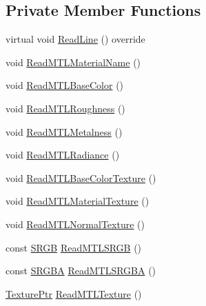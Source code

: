\subsection*{Private Member Functions}
\begin{DoxyCompactItemize}
\item 
virtual void \mbox{\hyperlink{classmage_1_1rendering_1_1loader_1_1_m_t_l_reader_a1a05fa5122b1db5fd095a778fc37d230}{Read\+Line}} () override
\item 
void \mbox{\hyperlink{classmage_1_1rendering_1_1loader_1_1_m_t_l_reader_ab123422945f5937ffe484c1076a6858b}{Read\+M\+T\+L\+Material\+Name}} ()
\item 
void \mbox{\hyperlink{classmage_1_1rendering_1_1loader_1_1_m_t_l_reader_ae228231b40bc5b8a6fdff3a9a5698530}{Read\+M\+T\+L\+Base\+Color}} ()
\item 
void \mbox{\hyperlink{classmage_1_1rendering_1_1loader_1_1_m_t_l_reader_a01438c92852592fd719a85d146e38b65}{Read\+M\+T\+L\+Roughness}} ()
\item 
void \mbox{\hyperlink{classmage_1_1rendering_1_1loader_1_1_m_t_l_reader_a14aa8cd5655730234c460c6060552f68}{Read\+M\+T\+L\+Metalness}} ()
\item 
void \mbox{\hyperlink{classmage_1_1rendering_1_1loader_1_1_m_t_l_reader_acfafc2485c4b84ef84360e35ac8247eb}{Read\+M\+T\+L\+Radiance}} ()
\item 
void \mbox{\hyperlink{classmage_1_1rendering_1_1loader_1_1_m_t_l_reader_a67198ee5158ee7d77e907f6538030aee}{Read\+M\+T\+L\+Base\+Color\+Texture}} ()
\item 
void \mbox{\hyperlink{classmage_1_1rendering_1_1loader_1_1_m_t_l_reader_a62b4c2d4106fb11f55af6a7de29ad37a}{Read\+M\+T\+L\+Material\+Texture}} ()
\item 
void \mbox{\hyperlink{classmage_1_1rendering_1_1loader_1_1_m_t_l_reader_afc25c8d259af6fbeb06a1e189f247e75}{Read\+M\+T\+L\+Normal\+Texture}} ()
\item 
const \mbox{\hyperlink{structmage_1_1_s_r_g_b}{S\+R\+GB}} \mbox{\hyperlink{classmage_1_1rendering_1_1loader_1_1_m_t_l_reader_aaefa7c67f90d7d592366acdb898993b3}{Read\+M\+T\+L\+S\+R\+GB}} ()
\item 
const \mbox{\hyperlink{structmage_1_1_s_r_g_b_a}{S\+R\+G\+BA}} \mbox{\hyperlink{classmage_1_1rendering_1_1loader_1_1_m_t_l_reader_a5b03c5c7aee393e60ea6c3bd7ff15614}{Read\+M\+T\+L\+S\+R\+G\+BA}} ()
\item 
\mbox{\hyperlink{namespacemage_1_1rendering_a6f3ae54f825328465b0cdde0f0de4a36}{Texture\+Ptr}} \mbox{\hyperlink{classmage_1_1rendering_1_1loader_1_1_m_t_l_reader_abf1609fbd22075fa4e692b7b6eab06fd}{Read\+M\+T\+L\+Texture}} ()
\end{DoxyCompactItemize}
